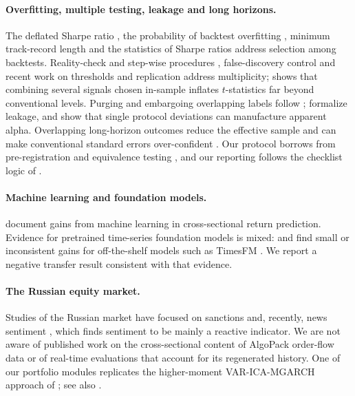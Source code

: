\paragraph{Overfitting, multiple testing, leakage and long horizons.}
The deflated Sharpe ratio \citep{bailey2014dsr}, the probability of backtest overfitting \citep{bailey2017pbo}, minimum track-record length \citep{bailey2012sharpe} and the statistics of Sharpe ratios \citep{lo2002} address selection among backtests. Reality-check and step-wise procedures \citep{sullivan1999,white2000,hansen2005,romano2005}, false-discovery control \citep{benjamini1995,benjamini2001} and recent work on thresholds and replication \citep{harvey2016,harvey2020,chordia2020,hou2020,giglio2021} address multiplicity; \citet{novymarx2015} shows that combining several signals chosen in-sample inflates $t$-statistics far beyond conventional levels. Purging and embargoing overlapping labels follow \citet{lopezdeprado2018}; \citet{kaufman2012} formalize leakage, and \citet{zhang2026} show that single protocol deviations can manufacture apparent alpha. Overlapping long-horizon outcomes reduce the effective sample and can make conventional standard errors over-confident \citep{hjalmarsson2011,boudoukh2019}. Our protocol borrows from pre-registration \citep{nosek2018} and equivalence testing \citep{lakens2017,lakens2018}, and our reporting follows the checklist logic of \citet{khushi2026}.

\paragraph{Machine learning and foundation models.}
\citet{gu2020} document gains from machine learning in cross-sectional return prediction. Evidence for pretrained time-series foundation models is mixed: \citet{rahimikia2025} and \citet{alonso2026} find small or inconsistent gains for off-the-shelf models such as TimesFM \citep{das2024}. We report a negative transfer result consistent with that evidence.

\paragraph{The Russian equity market.}
Studies of the Russian market have focused on sanctions \citep{ankudinov2017,dovbnya2020} and, recently, news sentiment \citep{makeeva2026}, which finds sentiment to be mainly a reactive indicator. We are not aware of published work on the cross-sectional content of AlgoPack order-flow data or of real-time evaluations that account for its regenerated history. One of our portfolio modules replicates the higher-moment VAR-ICA-MGARCH approach of \citet{mikhaylov2026}; see also \citet{lassance2022}.
